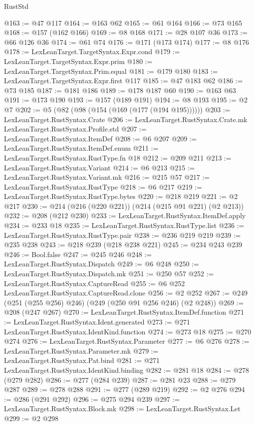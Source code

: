 \begin{lexlean}{RustStd}
\begin{coremodule}
@163 := @47 @117
@164 := @163 @62
@165 := @61 @164
@166 := @73 @165
@168 := @157 (@162 @166)
@169 := @8 @168
@171 := @28 @107 @36
@173 := @66 @126 @36
@174 := @61 @74
@176 := @171 (@173 @174)
@177 := @8 @176
@178 := LexLeanTarget.TargetSyntax.Expr.cond
@179 := LexLeanTarget.TargetSyntax.Expr.prim
@180 := LexLeanTarget.TargetSyntax.Prim.equal
@181 := @179 @180
@183 := LexLeanTarget.TargetSyntax.Expr.first @117
@185 := @47 @183 @62
@186 := @73 @185
@187 := @181 @186
@189 := @178 @187 @60
@190 := @163 @63
@191 := @173 @190
@193 := @157 (@189 @191)
@194 := @8 @193
@195 := @2 @7
@202 := @5 (@82 (@98 (@154 (@169 (@177 (@194 @195))))))
@203 := LexLeanTarget.RustSyntax.Crate
@206 := LexLeanTarget.RustSyntax.Crate.mk LexLeanTarget.RustSyntax.Profile.std
@207 := LexLeanTarget.RustSyntax.ItemDef
@208 := @6 @207
@209 := LexLeanTarget.RustSyntax.ItemDef.enum
@211 := LexLeanTarget.RustSyntax.RustType.fn @18
@212 := @209 @211
@213 := LexLeanTarget.RustSyntax.Variant
@214 := @6 @213
@215 := LexLeanTarget.RustSyntax.Variant.mk
@216 := @215 @57
@217 := LexLeanTarget.RustSyntax.RustType
@218 := @6 @217
@219 := LexLeanTarget.RustSyntax.RustType.bytes
@220 := @218 @219
@221 := @2 @217
@230 := @214 (@216 (@220 @221)) (@214 (@215 @91 @221) (@2 @213))
@232 := @208 (@212 @230)
@233 := LexLeanTarget.RustSyntax.ItemDef.apply
@234 := @233 @18
@235 := LexLeanTarget.RustSyntax.RustType.list
@236 := LexLeanTarget.RustSyntax.RustType.pair
@238 := @236 @219 @219
@239 := @235 @238
@243 := @218 @239 (@218 @238 @221)
@245 := @234 @243 @239
@246 := Bool.false
@247 := @245 @246
@248 := LexLeanTarget.RustSyntax.Dispatch
@249 := @6 @248
@250 := LexLeanTarget.RustSyntax.Dispatch.mk
@251 := @250 @57
@252 := LexLeanTarget.RustSyntax.CaptureRead
@255 := @6 @252 LexLeanTarget.RustSyntax.CaptureRead.clone
@256 := @2 @252
@267 := @249 (@251 (@255 @256) @246) (@249 (@250 @91 @256 @246) (@2 @248))
@269 := @208 (@247 @267)
@270 := LexLeanTarget.RustSyntax.ItemDef.function
@271 := LexLeanTarget.RustSyntax.Ident.generated
@273 := @271 LexLeanTarget.RustSyntax.IdentKind.function
@274 := @273 @18
@275 := @270 @274
@276 := LexLeanTarget.RustSyntax.Parameter
@277 := @6 @276
@278 := LexLeanTarget.RustSyntax.Parameter.mk
@279 := LexLeanTarget.RustSyntax.Pat.bind
@281 := @271 LexLeanTarget.RustSyntax.IdentKind.binding
@282 := @281 @18
@284 := @278 (@279 @282)
@286 := @277 (@284 @239)
@287 := @281 @23
@288 := @279 @287
@289 := @278 @288
@291 := @277 (@289 @219)
@292 := @2 @276
@294 := @286 (@291 @292)
@296 := @275 @294 @239
@297 := LexLeanTarget.RustSyntax.Block.mk
@298 := LexLeanTarget.RustSyntax.Let
@299 := @2 @298

\end{coremodule}
\end{lexlean}
